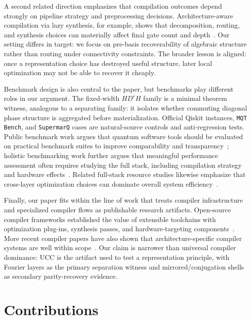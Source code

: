 \documentclass[11pt]{article}
\begin{document}
A second related direction emphasizes that compilation outcomes depend strongly
on pipeline strategy and preprocessing decisions. Architecture-aware
compilation via lazy synthesis, for example, shows that decomposition, routing,
and synthesis choices can materially affect final gate count and
depth~\cite{martiel2022lazy}. Our setting differs in target: we focus on
pre-basis recoverability of algebraic structure rather than routing under
connectivity constraints. The broader lesson is aligned: once a representation
choice has destroyed useful structure, later local optimization may not be able
to recover it cheaply.

Benchmark design is also central to the paper, but benchmarks play different
roles in our argument. The fixed-width $H D^r H$ family is a minimal theorem
witness, analogous to a separating family: it isolates whether commuting
diagonal phase structure is aggregated before materialization. Official Qiskit
instances, \texttt{MQT Bench}, and \texttt{SupermarQ} cases are natural-source
controls and anti-regression tests. Public benchmark work argues that quantum
software tools should be evaluated on practical benchmark suites to improve
comparability and transparency~\cite{quetschlich2023mqtbench}; holistic
benchmarking work further argues that meaningful performance assessment often
requires studying the full stack, including compilation strategy and hardware
effects~\cite{mills2021holistic}. Related full-stack resource studies likewise
emphasize that cross-layer optimization choices can dominate overall system
efficiency~\cite{fellousasiani2023mnr}.

Finally, our paper fits within the line of work that treats compiler
infrastructure and specialized compiler flows as publishable research artifacts.
Open-source compiler frameworks established the value of extensible toolchains
with optimization plug-ins, synthesis passes, and hardware-targeting
components~\cite{steiger2018projectq}. More recent compiler papers have also
shown that architecture-specific compiler systems are well within
scope~\cite{kreppel2023shuttling,tan2024dpqa,watkins2024surfacecode}. Our
claim is narrower than universal compiler dominance: UCC is the artifact used to
test a representation principle, with Fourier layers as the primary separation
witness and mirrored/conjugation shells as secondary parity-recovery evidence.

\section{Contributions}
\end{document}
